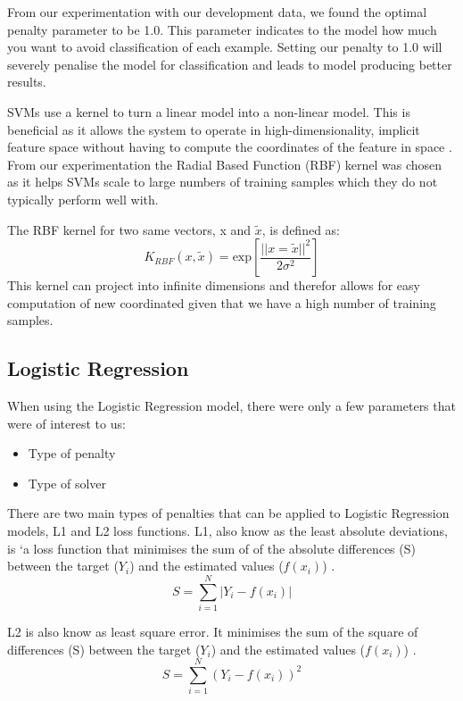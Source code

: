 \documentclass[bsc,frontabs,twoside,singlespacing,parskip,deptreport]{infthesis}     %
\begin{document}
 From our experimentation with our development data, we found the optimal penalty parameter to be 1.0.
 This parameter indicates to the model how much you want to avoid classification of each example.
 Setting our penalty to 1.0 will severely penalise the model for classification and leads to model producing
 better results.

 SVMs use a kernel to turn a linear model into a non-linear model. This is beneficial as it allows the system
 to operate in high-dimensionality, implicit feature space without having to compute the coordinates of the feature
 in space \cite{hofmann2008kernel}.
 From our experimentation the Radial Based Function (RBF) kernel was chosen as it helps SVMs scale to large numbers of
 training samples which they do not typically perform well with.

 The RBF kernel for two same vectors, x and $\tilde{x}$, is defined as:
 \begin{equation}
   K_{RBF} (x, \tilde{x}) = \text{exp}[ \frac{||x =\tilde{x}||^2}{2\sigma^2}]\nonumber
 \end{equation}
\cite{hofmann2008kernel}
 This kernel can project into infinite dimensions and therefor allows for easy computation of new coordinated given that
 we have a high number of training samples.
 
 \subsection{Logistic Regression}\label{sec:log-reg}
 When using the Logistic Regression model, there were only a few parameters that were of interest to us:
 \begin{itemize}
   \item Type of penalty
   \item Type of solver
 \end{itemize}

 There are two main types of penalties that can be applied to Logistic Regression models, L1 and L2 loss functions.
 L1, also know as  the least absolute deviations, is `a loss function that minimises the sum of of the absolute
 differences (S) between the target ($Y_i$) and the estimated values ($f(x_{i})$) \cite{l1l2}.
 \begin{equation}
   S = \sum_{i=1}^{N} | Y_i - f(x_i)|\nonumber
   \end{equation}
 
 L2 is also know as least square error. It minimises the sum of the square of differences (S) between
 the target ($Y_i$) and the estimated values ($f(x_{i})$) \cite{l1l2}.
 \begin{equation}
   S = \sum_{i=1}^{N} ( Y_i - f(x_i))^2\nonumber
   \end{equation}
\end{document}
